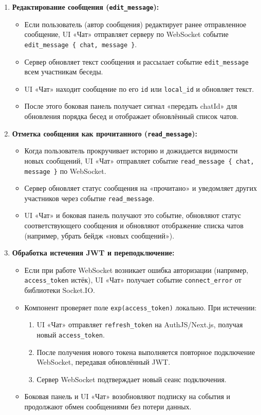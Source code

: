 \begin{enumerate}
    \item \textbf{Редактирование сообщения (\texttt{edit\_message}):}
    \begin{itemize}
        \item Если пользователь (автор сообщения) редактирует ранее отправленное сообщение, UI «Чат» отправляет серверу по WebSocket событие \texttt{edit\_message \{ chat, message \}}.
        \item Сервер обновляет текст сообщения и рассылает событие \texttt{edit\_message} всем участникам беседы.
        \item UI «Чат» находит сообщение по его \texttt{id} или \texttt{local\_id} и обновляет текст.
        \item После этого боковая панель получает сигнал «передать chatId» для обновления порядка бесед и отображает обновлённый список чатов.
    \end{itemize}

    \item \textbf{Отметка сообщения как прочитанного (\texttt{read\_message}):}
    \begin{itemize}
        \item Когда пользователь прокручивает историю и дожидается видимости новых сообщений, UI «Чат» отправляет событие \texttt{read\_message \{ chat, message \}} по WebSocket.
        \item Сервер обновляет статус сообщения на «прочитано» и уведомляет других участников через событие \texttt{read\_message}.
        \item UI «Чат» и боковая панель получают это событие, обновляют статус соответствующего сообщения и обновляют отображение списка чатов (например, убрать бейдж «новых сообщений»).
    \end{itemize}

    \item \textbf{Обработка истечения JWT и переподключение:}
    \begin{itemize}
        \item Если при работе WebSocket возникает ошибка авторизации (например, \texttt{access\_token} истёк), UI «Чат» получает событие \texttt{connect\_error} от библиотеки Socket.IO.
        \item Компонент проверяет поле \texttt{exp(access\_token)} локально. При истечении:
        \begin{enumerate}
            \item UI «Чат» отправляет \texttt{refresh\_token} на AuthJS/Next.js, получая новый \texttt{access\_token}.
            \item После получения нового токена выполняется повторное подключение WebSocket, передавая обновлённый JWT.
            \item Сервер WebSocket подтверждает новый сеанс подключения.
        \end{enumerate}
        \item Боковая панель и UI «Чат» возобновляют подписку на события и продолжают обмен сообщениями без потери данных.
    \end{itemize}
\end{enumerate}

